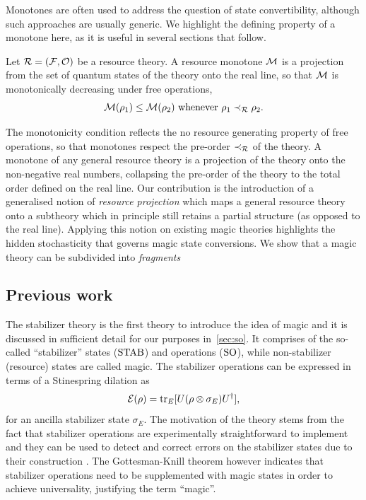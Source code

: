 \documentclass[pra,
aps,
twocolumn,
superscriptaddress,
groupedaddress,
nofootinbib,
reprint
]{revtex4-1}
\begin{document}
Monotones are often used  to address the question of state convertibility, although such approaches are usually generic.
We highlight the defining property of a monotone here, as it is useful in several sections that follow.
\begin{definition}\label{def:mono}
    Let $\mathcal{R} = (\mathcal{F}, \mathcal{O})$ be a resource theory.
    A resource monotone $\mathcal{M}$ is a projection from the set of quantum states of the theory onto the real line, so that $\mathcal{M}$ is monotonically decreasing under free operations,
    \begin{equation}
        \mathcal{M}(\rho_1) \leq \mathcal{M}(\rho_2)\ \text{whenever}\ \rho_1 \prec_{\mathcal{R}} \rho_2.
    \end{equation}
\end{definition}
The monotonicity condition reflects the no resource generating property of free operations, so that monotones respect the pre-order $\prec_{\mathcal{R}}$ of the theory.
A monotone of any general resource theory is a projection of the theory onto the non-negative real numbers, collapsing the pre-order of the theory to the total order defined on the real line.
Our contribution is the introduction of a generalised notion of \emph{resource projection} which maps a general resource theory onto a subtheory which in principle still retains a partial structure (as opposed to the real line).
Applying this notion on existing magic theories highlights the hidden stochasticity that governs magic state conversions.
We show that a magic theory can be subdivided into \emph{fragments} 

\subsection{Previous work}\label{sec:prev}

The stabilizer theory  is the first theory to introduce the idea of magic and it is discussed in sufficient detail for our purposes in~\cref{sec:so}. 
It comprises of the so-called ``stabilizer'' states (${\rm{STAB}}$) and operations (${\rm{SO}}$), while non-stabilizer (resource) states are called magic.
The stabilizer operations can be expressed in terms of a Stinespring dilation as 
\begin{equation}
    \mathcal{E}(\rho) = {\rm{tr}}_E [U(\rho \otimes \sigma_E)U^\dagger],
\end{equation} 
for an ancilla stabilizer state $\sigma_E$. 
The motivation of the theory stems from the fact that stabilizer operations are experimentally straightforward to implement and they can be used to detect and correct errors on the stabilizer states due to their construction .
The Gottesman-Knill theorem however indicates that stabilizer operations need to be supplemented with magic states in order to achieve universality, justifying the term ``magic''.
\end{document}
